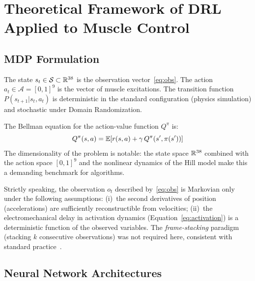 \chapter{Theoretical Framework of DRL Applied to Muscle Control}
\label{chap:drl}

\section{MDP Formulation}

The state $s_t \in \mathcal{S} \subset \mathbb{R}^{38}$ is the observation
vector~\eqref{eq:obs}. The action $a_t \in \mathcal{A} = [0,1]^9$ is the vector of
muscle excitations. The transition function $P(s_{t+1}|s_t,a_t)$ is deterministic
in the standard configuration (physics simulation) and stochastic under Domain
Randomization.

The Bellman equation for the action-value function $Q^\pi$ is:
\begin{equation}
  Q^\pi(s,a) = \mathbb{E}\!\left[r(s,a) + \gamma\,Q^\pi(s', \pi(s'))\right]
  \label{eq:bellman}
\end{equation}
The dimensionality of the problem is notable: the state space $\mathbb{R}^{38}$ combined
with the action space $[0,1]^9$ and the nonlinear dynamics of the Hill model make
this a demanding benchmark for \DRL{} algorithms.

\begin{proposition}
Strictly speaking, the observation $o_t$ described by~\eqref{eq:obs} is Markovian
only under the following assumptions: (i)~the second derivatives of position
(accelerations) are sufficiently reconstructible from velocities; (ii)~the
electromechanical delay in activation dynamics (Equation~\eqref{eq:activation}) is
a deterministic function of the observed variables. The \textit{frame-stacking}
paradigm (stacking $k$ consecutive observations) was not required here, consistent
with standard practice~\parencite{Caggiano2022}.
\end{proposition}

\section{Neural Network Architectures}

